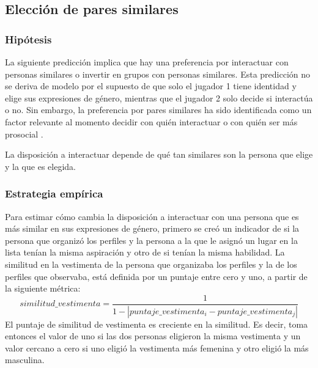 
\subsection{Elección de pares similares}
\subsubsection{Hipótesis}
La siguiente predicción implica que hay una preferencia por interactuar con personas similares o invertir en grupos con personas similares. Esta predicción no se deriva de modelo por el supuesto de que solo el jugador 1 tiene identidad y elige sus expresiones de género, mientras que el jugador 2 solo decide si interactúa o no. Sin embargo, la preferencia por pares similares ha sido identificada como un factor relevante al momento decidir con quién interactuar o con quién ser más prosocial \citep{chakravarty2017discriminationexclusion, halevy2012ingroupoutgroup, chen2009groupidentity, tajfel1971intergroupbehaviour}.

\begin{hyp}
La disposición a interactuar depende de qué tan similares son la persona que elige y la que es elegida. 
\end{hyp}

\subsubsection{Estrategia empírica}
    Para estimar cómo cambia la disposición a interactuar con una persona que es más similar en sus expresiones de género, primero se creó un indicador de si la persona que organizó los perfiles y la persona a la que le asignó un lugar en la lista tenían la misma aspiración y otro de si tenían la misma habilidad. La similitud en la vestimenta de la persona que organizaba los perfiles y la de los perfiles que observaba, está definida por un puntaje entre cero y uno, a partir de la siguiente métrica: 
\begin{equation*}
    similitud\_vestimenta=\frac{1}{1-|puntaje\_vestimenta_i - puntaje\_vestimenta_j|}
\end{equation*}
El puntaje de similitud de vestimenta es creciente en la similitud. Es decir, toma entonces el valor de uno si las dos personas eligieron la misma vestimenta y un valor cercano a cero si uno eligió la vestimenta más femenina y otro eligió la más masculina.

